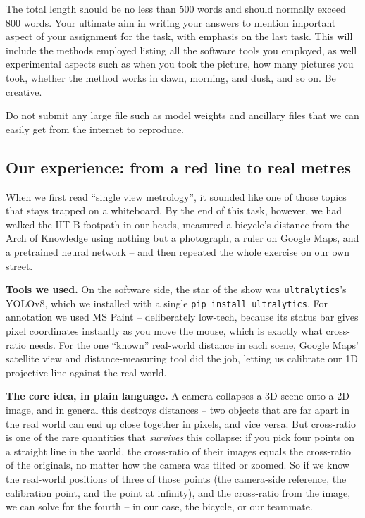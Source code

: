 \documentclass[11pt]{article}
\newenvironment{studentSpace}{\itshape}{}
\begin{document}
The total length should be no less than 500 words and
should normally exceed 800 words.  Your ultimate aim in writing your answers
to mention important aspect of your assignment for the task, with
emphasis on the last task.  This will include the methods employed
listing all the software tools you employed, as well experimental
aspects such as when you took the picture, how many pictures 
you took, whether the method works in dawn, morning, and dusk, and so
on. Be creative.  

Do not submit any large file such as
model weights and ancillary files that we can easily get from the
internet to reproduce.

\begin{studentSpace}

\subsection*{Our experience: from a red line to real metres}

When we first read ``single view metrology'', it sounded like one of
those topics that stays trapped on a whiteboard. By the end of this
task, however, we had walked the IIT-B footpath in our heads, measured
a bicycle's distance from the Arch of Knowledge using nothing but a
photograph, a ruler on Google Maps, and a pretrained neural network --
and then repeated the whole exercise on our own street.

\textbf{Tools we used.} On the software side, the star of the show was
\texttt{ultralytics}'s YOLOv8, which we installed with a single
\texttt{pip install ultralytics}. For annotation we used MS Paint --
deliberately low-tech, because its status bar gives pixel coordinates
instantly as you move the mouse, which is exactly what cross-ratio
needs. For the one ``known'' real-world distance in each scene, Google
Maps' satellite view and distance-measuring tool did the job, letting
us calibrate our 1D projective line against the real world.

\textbf{The core idea, in plain language.} A camera collapses a 3D
scene onto a 2D image, and in general this destroys distances --
two objects that are far apart in the real world can end up close
together in pixels, and vice versa. But cross-ratio is one of the rare
quantities that \emph{survives} this collapse: if you pick four points
on a straight line in the world, the cross-ratio of their images equals
the cross-ratio of the originals, no matter how the camera was tilted
or zoomed. So if we know the real-world positions of three of those
points (the camera-side reference, the calibration point, and the
point at infinity), and the cross-ratio from the image, we can solve
for the fourth -- in our case, the bicycle, or our teammate.


\end{studentSpace}
\end{document}
